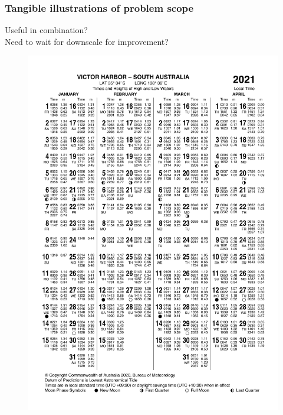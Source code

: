 \begin{frame}
\frametitle{Tangible illustrations of problem scope}
\centering
Useful in combination?\\
Need to wait for downscale for improvement?
\begin{minipage}{0.45\textwidth}
    \begin{figure}      
    \includegraphics[trim={0 8cm 0 0},clip,height=\textheight]{figures/images/IDO59001_2021_SA_TP006.pdf}
    \end{figure}
\end{minipage}
\hfill
\begin{minipage}{0.45\textwidth}
    \begin{figure}      

\end{figure}
\end{minipage}
\end{frame}
